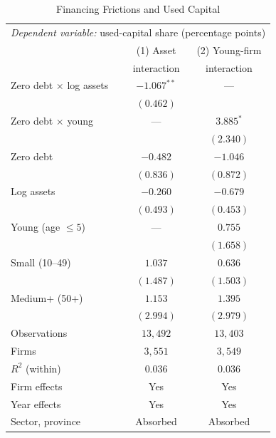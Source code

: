 \begin{table}[H]
\centering
\small
\setlength{\tabcolsep}{8pt}
\caption{Financing Frictions and Used Capital}
\label{tab:emp_panel}
\begin{tabular}{lcc}
\toprule
\multicolumn{3}{l}{\emph{Dependent variable:} used-capital share (percentage points)} \\
\addlinespace[2pt]
 & (1) Asset & (2) Young-firm \\
 & interaction & interaction \\
\midrule
Zero debt $\times$ log assets & $-1.067^{**}$ & --- \\
 & $(0.462)$ &  \\
Zero debt $\times$ young & --- & $3.885^{*}$ \\
 &  & $(2.340)$ \\
Zero debt & $-0.482$ & $-1.046$ \\
 & $(0.836)$ & $(0.872)$ \\
Log assets & $-0.260$ & $-0.679$ \\
 & $(0.493)$ & $(0.453)$ \\
Young (age $\le 5$) & --- & $0.755$ \\
 &  & $(1.658)$ \\
Small (10--49) & $1.037$ & $0.636$ \\
 & $(1.487)$ & $(1.503)$ \\
Medium+ (50+) & $1.153$ & $1.395$ \\
 & $(2.994)$ & $(2.979)$ \\
\midrule
Observations & $13{,}492$ & $13{,}403$ \\
Firms & $3{,}551$ & $3{,}549$ \\
$R^{2}$ (within) & $0.036$ & $0.036$ \\
Firm effects & Yes & Yes \\
Year effects & Yes & Yes \\
Sector, province & Absorbed & Absorbed \\
\bottomrule
\end{tabular}
\end{table}
